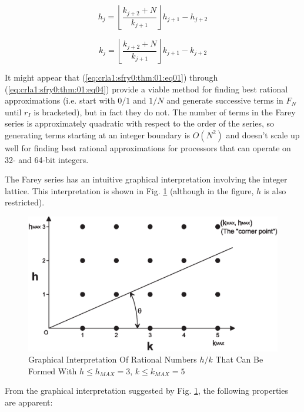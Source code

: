 \begin{equation}
\label{eq:crla1:sfry0:thm:01:eq03}
h_j  = \left\lfloor {\frac{{k_{j + 2}  + N}}{{k_{j + 1} }}}
\right\rfloor h_{j + 1}  - h_{j + 2}
\end{equation}

\begin{equation}
\label{eq:crla1:sfry0:thm:01:eq04}
k_j  = \left\lfloor {\frac{{k_{j + 2}  + N}}{{k_{j + 1} }}}
\right\rfloor k_{j + 1}  - k_{j + 2}
\end{equation}

It might appear that (\ref{eq:crla1:sfry0:thm:01:eq01}) through
(\ref{eq:crla1:sfry0:thm:01:eq04}) provide a viable method for finding
best rational approximations (i.e.  start with $0/1$ and $1/N$ and
generate successive terms in $F_N$ until $r_I$ is bracketed), but in fact
they do not.  The number of terms in the Farey series is approximately
quadratic with respect to the order of the series, so generating terms
starting at an integer boundary is $O(N^2)$ and doesn't scale up well for
finding best rational approximations for processors that can operate on
32- and 64-bit integers.

The Farey series has an intuitive graphical interpretation involving the
integer lattice.  This interpretation is shown in Fig.
\ref{fig:crla1:sfry0:00} (although in the figure, $h$ is also restricted).

\begin{figure}
\centering
\includegraphics[width=4.6in]{c_rla1/farey01a.eps}
\caption{Graphical Interpretation Of Rational Numbers
         $h/k$ That Can Be Formed With $h \leq h_{MAX}=3$, $k \leq k_{MAX}=5$}
\label{fig:crla1:sfry0:00}
\end{figure}

From the graphical interpretation suggested by Fig.
\ref{fig:crla1:sfry0:00}, the following properties are apparent:

